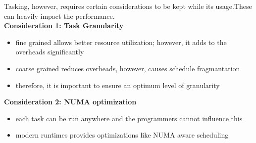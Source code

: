 \documentclass[12pt, a4paper]{report}
\begin{document}
Tasking, however, requires certain considerations to be kept while its usage.These can heavily impact the performance.\\[1em]
{\bfseries{Consideration 1: Task Granularity}}
\begin{itemize}
    \item fine grained allows better resource utilization; however, it adds to the overheads significantly
    \item coarse grained reduces overheads, however, causes schedule fragmantation
    \item therefore, it is important to ensure an optimum level of granularity
\end{itemize}

{\bfseries{Consideration 2: NUMA optimization}}
\begin{itemize}
    \item each task can be run anywhere and the programmers cannot influence this
    \item modern runtimes provides optimizations like NUMA aware scheduling
\end{itemize}
\end{document}
